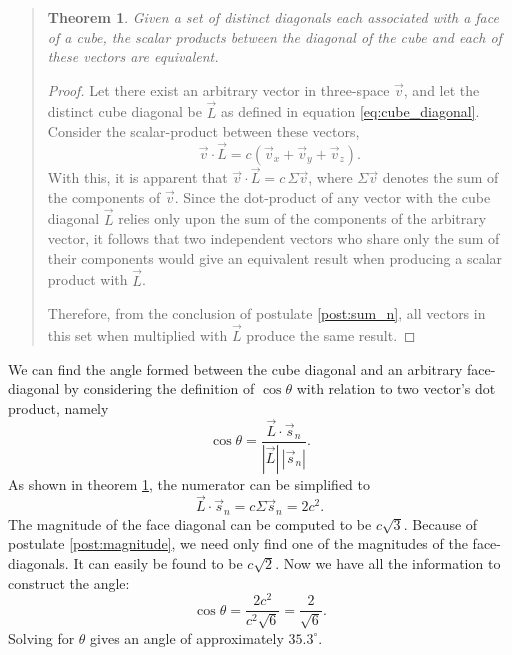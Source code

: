 \documentclass{article}
\newtheorem{theorem}{Theorem}
\begin{document}
\begin{quote}
\begin{theorem} \label{thm:scalar_product}
    Given a set of distinct diagonals each associated with a face of a cube, the scalar products between the diagonal of the cube and each of these vectors are equivalent.
\end{theorem}

\begin{proof}
    

    Let there exist an arbitrary vector in three-space $\vec{v}$, and let the distinct cube diagonal be $\vec{L}$ as defined in equation \ref{eq:cube_diagonal}. Consider the scalar-product between these vectors,
    \[
        \vec{v} \cdot \vec{L} = c( \vec{v}_x + \vec{v}_y + \vec{v}_z ).
    \]
    With this, it is apparent that $\vec{v} \cdot \vec{L} = c\,\Sigma \vec{v}$, where $\Sigma \vec{v}$ denotes the sum of the components of $\vec{v}$. Since the dot-product of any vector with the cube diagonal $\vec{L}$ relies only upon the sum of the components of the arbitrary vector, it follows that two independent vectors who share only the sum of their components would give an equivalent result when producing a scalar product with $\vec{L}$. 
    
    Therefore, from the conclusion of postulate \ref{post:sum_n}, all vectors in this set when multiplied with $\vec{L}$ produce the same result.
\end{proof}
\end{quote}

We can find the angle formed between the cube diagonal and an arbitrary face-diagonal by considering the definition of $\cos\theta$ with relation to two vector's dot product, namely
\[
    \cos\theta = \frac{\vec{L} \cdot \vec{s}_n}{|\vec{L}|\,|\vec{s}_n|}.  
\]
As shown in theorem \ref{thm:scalar_product}, the numerator can be simplified to
\[
    \vec{L} \cdot \vec{s}_n = c\Sigma \vec{s}_n = 2c^2.
\]
The magnitude of the face diagonal can be computed to be $c\sqrt{3}$. Because of postulate \ref{post:magnitude}, we need only find one of the magnitudes of the face-diagonals. It can easily be found to be $c\sqrt{2}$. Now we have all the information to construct the angle:
\[
    \cos\theta = \frac{2c^2}{c^2\sqrt{6}}  = \frac{2}{\sqrt{6}}.
\]
Solving for $\theta$ gives an angle of approximately $35.3^\circ$.
\end{document}
